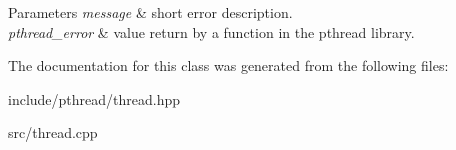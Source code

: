 \begin{DoxyParams}{Parameters}
{\em message} & short error description. \\
\hline
{\em pthread\+\_\+error} & value return by a function in the pthread library. \\
\hline
\end{DoxyParams}


The documentation for this class was generated from the following files\+:\begin{DoxyCompactItemize}
\item 
include/pthread/thread.\+hpp\item 
src/thread.\+cpp\end{DoxyCompactItemize}
